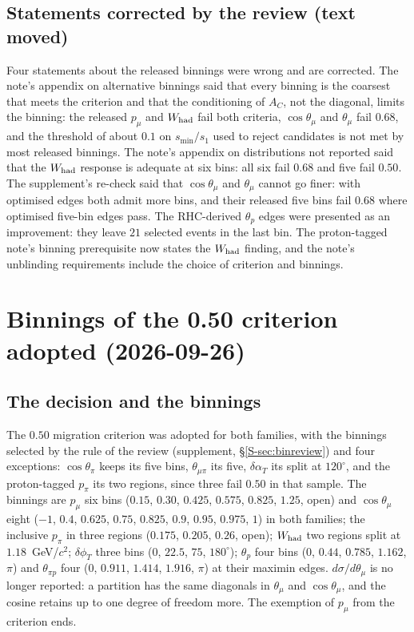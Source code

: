 \subsection{Statements corrected by the review (text moved)}
Four statements about the released binnings were wrong and are corrected. The note's appendix on
alternative binnings said that every binning is the coarsest that meets the criterion and that the
conditioning of $A_C$, not the diagonal, limits the binning: the released $p_\mu$ and
$W_{\rm had}$ fail both criteria, $\cos\theta_\mu$ and $\theta_\mu$ fail $0.68$, and the threshold of
about $0.1$ on $s_{\min}/s_1$ used to reject candidates is not met by most released binnings. The
note's appendix on distributions not reported said that the $W_{\rm had}$ response is adequate at
six bins: all six fail $0.68$ and five fail $0.50$. The supplement's re-check said that
$\cos\theta_\mu$ and $\theta_\mu$ cannot go finer: with optimised edges both admit more bins, and
their released five bins fail $0.68$ where optimised five-bin edges pass. The RHC-derived $\theta_p$
edges were presented as an improvement: they leave $21$ selected events in the last bin. The
proton-tagged note's binning prerequisite now states the $W_{\rm had}$ finding, and the note's
unblinding requirements include the choice of criterion and binnings.

\section{Binnings of the 0.50 criterion adopted (2026-09-26)}

\subsection{The decision and the binnings}
The $0.50$ migration criterion was adopted for both families, with the binnings selected by the
rule of the review (supplement, \S\ref{S-sec:binreview}) and four exceptions: $\cos\theta_\pi$ keeps
its five bins, $\theta_{\mu\pi}$ its five, $\delta\alpha_T$ its split at $120^\circ$, and the
proton-tagged $p_\pi$ its two regions, since three fail $0.50$ in that sample. The binnings are
$p_\mu$ six bins ($0.15$, $0.30$, $0.425$, $0.575$, $0.825$, $1.25$, open) and $\cos\theta_\mu$ eight
($-1$, $0.4$, $0.625$, $0.75$, $0.825$, $0.9$, $0.95$, $0.975$, $1$) in both families; the inclusive
$p_\pi$ in three regions ($0.175$, $0.205$, $0.26$, open); $W_{\rm had}$ two regions split at
$1.18$~GeV/$c^2$; $\delta\phi_T$ three bins ($0$, $22.5$, $75$, $180^\circ$); $\theta_p$ four bins
($0$, $0.44$, $0.785$, $1.162$, $\pi$) and $\theta_{\pi p}$ four ($0$, $0.911$, $1.414$, $1.916$, $\pi$)
at their maximin edges. $d\sigma/d\theta_\mu$ is no longer reported: a partition has the same
diagonals in $\theta_\mu$ and $\cos\theta_\mu$, and the cosine retains up to one degree of freedom
more. The exemption of $p_\mu$ from the criterion ends.

